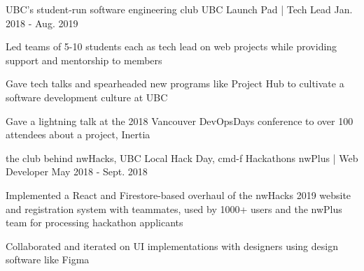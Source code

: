 \begin{cventries}

  \cventry
    {UBC's student-run software engineering club} %
    {UBC Launch Pad | Tech Lead} %
    {} %
    {Jan. 2018 - Aug. 2019} %
    {
      \begin{cvitems} %
        \item {Led teams of 5-10 students each as tech lead on web projects while providing support and mentorship to members}
        \item {Gave tech talks and spearheaded new programs like Project Hub to cultivate a software development culture at UBC}
        \item {Gave a lightning talk at the 2018 Vancouver DevOpsDays conference to over 100 attendees about a project, Inertia}
      \end{cvitems}
    }

  \cventry
    {the club behind nwHacks, UBC Local Hack Day, cmd-f Hackathons} %
    {nwPlus | Web Developer} %
    {} %
    {May 2018 - Sept. 2018} %
    {
      \begin{cvitems} %
        \item {Implemented a React and Firestore-based overhaul of the nwHacks 2019 website and registration system with teammates, used by 1000+ users and the nwPlus team for processing hackathon applicants}
        \item {Collaborated and iterated on UI implementations with designers using design software like Figma}
      \end{cvitems}
    }

\end{cventries}
